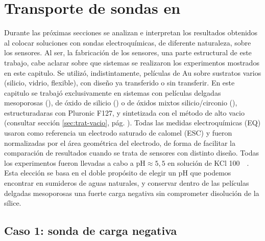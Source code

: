 				

\section{Transporte de sondas en \pdm}

	 Durante las próximas secciones se analizan e interpretan los resultados obtenidos al colocar soluciones con sondas electroquímicas, de diferente naturaleza, sobre los sensores. Al ser, la fabricación de los sensores, una parte estructural de este trabajo, cabe aclarar sobre que sistemas se realizaron los experimentos mostrados en este capitulo. Se utilizó, indistintamente, películas de Au sobre sustratos varios (silicio, vidrio, flexible), con diseño ya transferido o sin transferir. En este capitulo se trabajó exclusivamente en sistemas con películas delgadas mesoporosas (\pdm), de óxido de silicio (\pdmF) o de óxidos mixtos silicio/circonio (\pdmZ), estructuradaras con Pluronic F127, y sintetizada con el método de alto vacio (consultar sección \ref{sec:trat-vacio}, pág. \pageref{sec:trat-vacio}). Todas las medidas electroquímicas (EQ) usaron como referencia un electrodo saturado de calomel (ESC) y fueron normalizadas por el área geométrica del electrodo, de forma de facilitar la comparación de resultados cuando se trata de sensores con distinto diseño. Todas los experimentos fueron llevadas a cabo a $\text{pH}\approx5,5$ en solución de KCl \SI{100}{\milli\Molar}. Esta elección se basa en el doble propósito de elegir un pH que podemos encontrar en sumideros de aguas naturales, y conservar dentro de las películas delgadas mesoporosas una fuerte carga negativa sin comprometer disolución de la sílice.

	\subsection{Caso 1: sonda de carga negativa}

